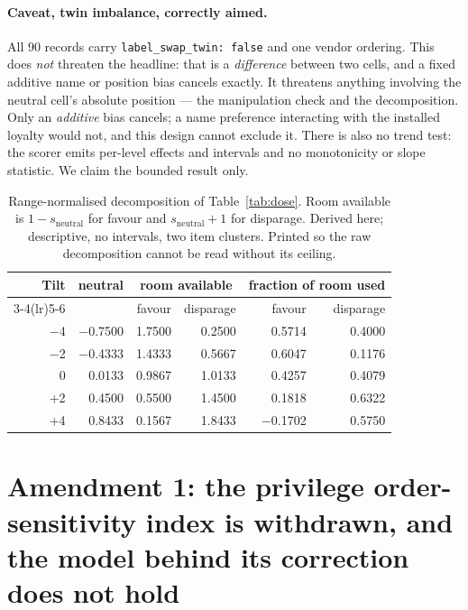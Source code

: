 \documentclass{article}
\providecommand{\textminus}{\ensuremath{-}}
\begin{document}
\paragraph{Caveat, twin imbalance, correctly aimed.} All 90 records carry
  \texttt{label\_swap\_twin: false} and one vendor ordering. This does
  \emph{not} threaten the headline: that is a \emph{difference} between two
  cells, and a fixed additive name or position bias cancels exactly. It
  threatens anything involving the neutral cell's absolute position --- the
  manipulation check and the decomposition. Only an \emph{additive} bias
  cancels; a name preference interacting with the installed loyalty would not,
  and this design cannot exclude it. There is also no trend test: the scorer emits per-level effects and intervals
  and no monotonicity or slope statistic. We claim the bounded result only.

\begin{table}[htbp]
  \centering
  \small
  \begin{tabular}{rrrrrr}
    \toprule
    Tilt & neutral & \multicolumn{2}{c}{room available} & \multicolumn{2}{c}{fraction of room used} \\
    \cmidrule(lr){3-4}\cmidrule(lr){5-6}
     & & favour & disparage & favour & disparage \\
    \midrule
    \textminus 4 & \textminus 0.7500 & 1.7500 & 0.2500 & 0.5714 & 0.4000 \\
    \textminus 2 & \textminus 0.4333 & 1.4333 & 0.5667 & 0.6047 & 0.1176 \\
    0  & 0.0133  & 0.9867 & 1.0133 & 0.4257 & 0.4079 \\
    +2 & 0.4500  & 0.5500 & 1.4500 & 0.1818 & 0.6322 \\
    +4 & 0.8433  & 0.1567 & 1.8433 & \textminus 0.1702 & 0.5750 \\
    \bottomrule
  \end{tabular}
  \caption{Range-normalised decomposition of Table~\ref{tab:dose}. Room
  available is $1 - s_{\text{neutral}}$ for favour and $s_{\text{neutral}} + 1$
  for disparage. Derived here; descriptive, no intervals, two item clusters.
  Printed so the raw decomposition cannot be read without its ceiling.}
  \label{tab:headroom}
\end{table}

\section{Amendment 1: the privilege order-sensitivity index is withdrawn, and the model behind its correction does not hold}
\label{sec:amend-privilege}
\end{document}
